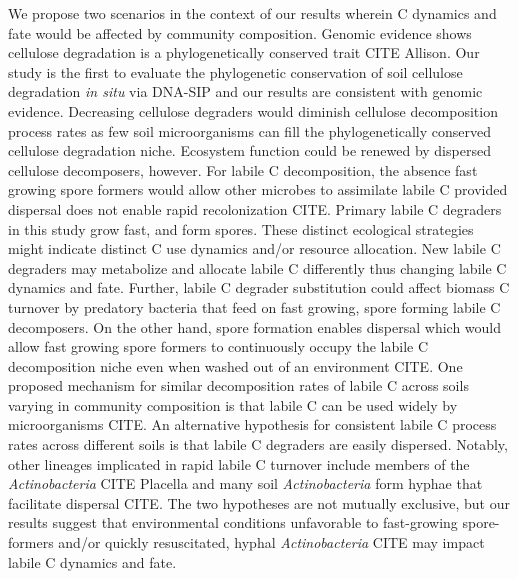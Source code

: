 We propose two scenarios in the context of our results wherein C dynamics and
fate would be affected by community composition. Genomic evidence shows
cellulose degradation is a phylogenetically conserved trait CITE Allison. Our
study is the first to evaluate the phylogenetic conservation of soil cellulose
degradation \textit{in situ} via DNA-SIP and our results are consistent with
genomic evidence. Decreasing cellulose degraders would diminish cellulose
decomposition process rates as few soil microorganisms can fill the
phylogenetically conserved cellulose degradation niche. Ecosystem function
could be renewed by dispersed cellulose decomposers, however. For labile
C decomposition, the absence fast growing spore formers would allow other
microbes to assimilate labile C provided dispersal does not enable rapid
recolonization CITE. Primary labile C degraders in this study grow fast, and
form spores. These distinct ecological strategies might indicate distinct C use
dynamics and/or resource allocation. New labile C degraders may metabolize and
allocate labile C differently thus changing labile C dynamics and fate.
Further, labile C degrader substitution could affect biomass C turnover by
predatory bacteria that feed on fast growing, spore forming labile
C decomposers. On the other hand, spore formation enables dispersal which would
allow fast growing spore formers to continuously occupy the labile
C decomposition niche even when washed out of an environment CITE. One proposed
mechanism for similar decomposition rates of labile C across soils varying in
community composition is that labile C can be used widely by microorganisms
CITE. An alternative hypothesis for consistent labile C process rates across
different soils is that labile C degraders are easily dispersed. Notably, other
lineages implicated in rapid labile C turnover include members of the
\textit{Actinobacteria} CITE Placella and many soil \textit{Actinobacteria}
form hyphae that facilitate dispersal CITE. The two hypotheses are not mutually
exclusive, but our results suggest that environmental conditions unfavorable to
fast-growing spore-formers and/or quickly resuscitated, hyphal
\textit{Actinobacteria} CITE may impact labile C dynamics and fate.

